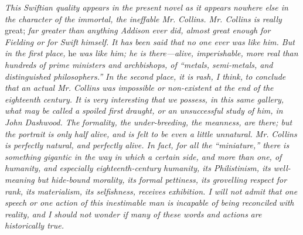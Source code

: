 \documentclass[12pt,openright]{book}
\begin{document}
\textit{This Swiftian quality appears in the present novel as it appears}\textit{ }\textit{nowhere else in the character of the immortal, the ineffable Mr.}\textit{ }\textit{Collins. Mr. Collins is really} great; \textit{far greater than anything Addison}\textit{ }\textit{ever did, almost great enough for Fielding or for Swift himself. It has}\textit{ }\textit{been said that no one ever was like him. But in the first}\textit{ }\textit{place,} he \textit{was like him; he is there—alive, imperishable, more real than hundreds}\textit{ }\textit{of prime ministers and archbishops, of “metals, semi-metals, and}\textit{ }\textit{distinguished philosophers.” In the second place, it is rash, I think,}\textit{ }\textit{to conclude that an actual Mr. Collins was impossible or non-existent at}\textit{ }\textit{the end of the eighteenth century. It is very interesting that we}\textit{ }\textit{possess, in this same gallery, what may be called a spoiled first}\textit{ }\textit{draught, or an unsuccessful study of him, in John Dashwood. The}\textit{ }\textit{formality, the under-breeding, the meanness, are there; but the portrait}\textit{ }\textit{is only half alive, and is felt to be even a little unnatural. Mr.}\textit{ }\textit{Collins is perfectly natural, and perfectly alive. In fact, for all the}\textit{ }\textit{“miniature,” there is something gigantic in the way in which a certain}\textit{ }\textit{side, and more than one, of humanity, and especially eighteenth-century}\textit{ }\textit{humanity, its Philistinism, its well-meaning but hide-bound morality,}\textit{ }\textit{its formal pettiness, its grovelling respect for rank, its materialism,}\textit{ }\textit{its selfishness, receives exhibition. I will not admit that one speech}\textit{ }\textit{or one action of this inestimable man is incapable of being reconciled}\textit{ }\textit{with reality, and I should not wonder if many of these words and actions}\textit{ }\textit{are historically true.}
\end{document}
